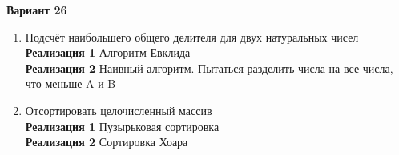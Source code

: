 \textbf{Вариант 26} 
\begin{enumerate}
    \item Подсчёт наибольшего общего делителя для двух натуральных чисел\\
\textbf{Реализация 1} Алгоритм Евклида\\
\textbf{Реализация 2} Наивный алгоритм. Пытаться разделить числа на все числа, что меньше A и B
\item Отсортировать целочисленный массив\\
\textbf{Реализация 1} Пузырьковая сортировка\\
\textbf{Реализация 2} Сортировка Хоара
\end{enumerate}

\pagebreak
